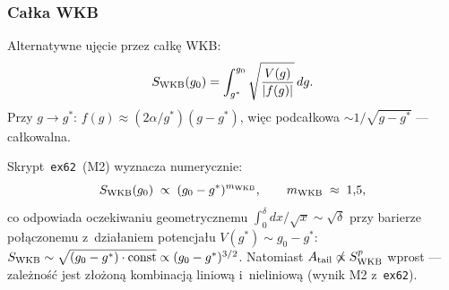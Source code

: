 \subsubsection{Całka WKB}

Alternatywne ujęcie przez całkę WKB:
\begin{equation}\label{eq:K-SWKB}
  S_{\rm WKB}(g_0)
  = \int_{g^*}^{g_0} \sqrt{\frac{V(g)}{|f(g)|}}\,dg.
\end{equation}
Przy $g \to g^*$: $f(g) \approx (2\alpha/g^*)(g-g^*)$, więc
podcałkowa $\sim 1/\sqrt{g-g^*}$ --- całkowalna.

\begin{result}%
\label{res:K-SWKB}
Skrypt~\texttt{ex62}~(M2) wyznacza numerycznie:
\begin{equation}\label{eq:K-SWKB-scaling}
  S_{\rm WKB}(g_0) \;\propto\; (g_0 - g^*)^{m_{\rm WKB}},
  \qquad
  m_{\rm WKB} \;\approx\; 1{,}5,
\end{equation}
co odpowiada oczekiwaniu geometrycznemu
$\int_0^\delta dx/\sqrt{x} \sim \sqrt{\delta}$ przy barierze
połączonemu z~działaniem potencjału $V(g^*) \sim g_0-g^*$:
$S_{\rm WKB} \sim \sqrt{(g_0-g^*)\cdot\mathrm{const}} \propto (g_0-g^*)^{3/2}$.
Natomiast $A_{\rm tail} \not\propto S_{\rm WKB}^p$ wprost ---
zależność jest złożoną kombinacją liniową i~nieliniową
(wynik M2 z~\texttt{ex62}).
\end{result}

